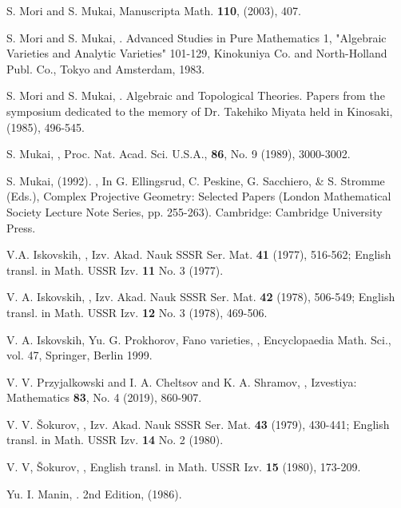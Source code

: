 \documentclass[11pt]{amsart}
\theoremstyle{plain}
\theoremstyle{definition}
\theoremstyle{expl}
\begin{document}
\begin{thebibliography}{26}
S. Mori and S. Mukai,
\newblock Manuscripta Math. \textbf{110}, (2003), 407.

S. Mori and S. Mukai,
. 
\newblock Advanced Studies in Pure Mathematics 1, "Algebraic Varieties and Analytic Varieties" 101-129, Kinokuniya Co. and North-Holland Publ. Co., Tokyo and Amsterdam, 1983.

S. Mori and S. Mukai,
.
\newblock Algebraic and Topological Theories. Papers from the symposium dedicated to the memory of Dr. Takehiko Miyata held in Kinosaki, (1985), 496-545.

S. Mukai,
,
\newblock Proc. Nat. Acad. Sci. U.S.A., \textbf{86}, No. 9 (1989), 3000-3002.

S. Mukai, (1992). 
,
\newblock In G. Ellingsrud, C. Peskine, G. Sacchiero, \& S. Stromme (Eds.), Complex Projective Geometry: Selected Papers (London Mathematical Society Lecture Note Series, pp. 255-263). Cambridge: Cambridge University Press. 

V.A. Iskovskih, 
,
\newblock Izv. Akad. Nauk SSSR Ser. Mat.  \textbf{41} (1977), 516-562; English transl. in Math. USSR Izv. \textbf{11} No. 3 (1977).

V. A. Iskovskih, 
, 
\newblock Izv. Akad. Nauk SSSR Ser. Mat.
\textbf{42} (1978), 506-549; English transl. in Math. USSR Izv. \textbf{12} No. 3 (1978), 469-506.

V. A. Iskovskih, Yu. G. Prokhorov, Fano varieties,
,
\newblock Encyclopaedia Math. Sci., vol. 47, Springer, Berlin 1999.

V. V. Przyjalkowski and I. A. Cheltsov and K. A. Shramov,
, 
\newblock Izvestiya: Mathematics \textbf{83}, No. 4 (2019), 860-907.

V. V. \v{S}okurov, 
,
\newblock Izv. Akad. Nauk SSSR Ser. Mat. \textbf{43} (1979), 430-441; English transl. in Math. USSR Izv. \textbf{14} No. 2 (1980).

V. V, \v{S}okurov, 
,
\newblock English transl. in Math. USSR Izv. \textbf{15} (1980), 173-209.

Yu. I. Manin,
.
\newblock 2nd Edition, (1986). 

\end{thebibliography}
\end{document}
